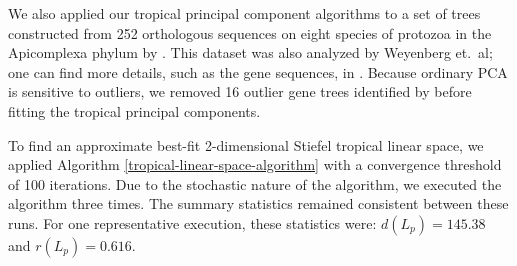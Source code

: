 \documentclass[12pt]{extarticle}
\numberwithin{theorem}{section}
\begin{document}
We also applied our tropical principal component algorithms to a set of trees constructed from 252
orthologous sequences on eight species of protozoa in the
Apicomplexa phylum by \cite{KWK}.   
This dataset was also analyzed by Weyenberg et.~al; one can find
more details, such as the gene sequences, in \cite{KDETrees}.
Because ordinary PCA is sensitive to outliers, we removed 16 outlier gene trees identified by \cite{KDETrees} before fitting the tropical principal components.

To find an approximate best-fit 2-dimensional Stiefel tropical linear space, we applied Algorithm \ref{tropical-linear-space-algorithm} with a convergence threshold of 100 iterations. Due to the stochastic nature of the algorithm, we executed the algorithm three times. %
The summary statistics remained consistent between these runs. For one representative execution, these statistics were: $d(L_p) = 145.38$ and $r(L_p)=0.616$. %

\begin{comment}\begin{table}
\centering
\caption{Tree topologies and frequency counts for  apicomplexa gene tree projections}
\label{apicomplexa-tropical-linear-space}
\begin{tabular}{|c|c|c|c|}
\hline
Count & Topology & Count & Topology\\\hline
112 & \texttt{[image: apicomplexa-tree3.png]} & 31 & \texttt{[image: apicomplexa-tree13.png]}\\ \hline
30 & \texttt{[image: apicomplexa-tree9.png]} & 26 & \texttt{[image: apicomplexa-tree1.png]}\\ \hline
20 & \texttt{[image: apicomplexa-tree4.png]} & 17 & \texttt{[image: apicomplexa-tree24.png]}\\ \hline
8 & \texttt{[image: apicomplexa-tree14.png]} & 7 & \texttt{[image: apicomplexa-tree43.png]}\\ \hline
1 & \texttt{[image: apicomplexa-tree202.png]} & \ & \ \\ \hline
\end{tabular}
\end{table}

Comparing the tropical PC's on tropical topology and tropical linear space, we can see that the most three frequent topologies of the projected trees for the apicomplexa data (which totally covered more than two thirds of all trees) are the same for these two methods.
\end{comment}
\end{document}

